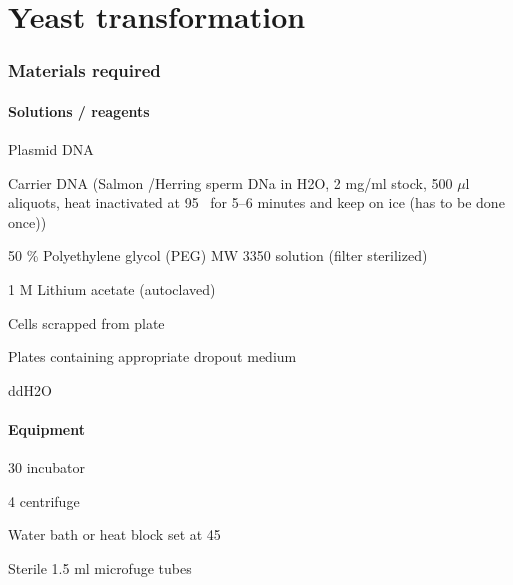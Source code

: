 \part{Yeast transformation}
 \newpage
\setlength{\parindent}{0pt}
\setcounter{secnumdepth}{5}
\setcounter{section}{0}
\renewcommand*{\theHsection}{trans.\the\value{section}}
\section {Materials required}
	\subsection{Solutions / reagents}
			\begin{packed_enum}
				\item Plasmid DNA
				\item Carrier DNA{} (Salmon /Herring sperm DNa in H{\scriptsize2}O, 2 mg/ml stock, 500 $\mu$l aliquots, heat inactivated at 95 \textcelsius\ for 5--6 minutes and keep on ice (has to be done once))
				\item 50 \% Polyethylene glycol (PEG) MW 3350 solution (filter sterilized)
				\item 1 M Lithium acetate (autoclaved)
				\item Cells scrapped from plate
				\item Plates containing appropriate dropout medium
				\item ddH{\scriptsize2}O
					\end{packed_enum}
	\subsection{Equipment}
			\begin{packed_enum}
				\item 30 {\textcelsius} incubator
				\item 4 {\textcelsius} centrifuge
				\item Water bath or heat block set at 45 \textcelsius
				\item Sterile 1.5 ml microfuge tubes
			\end{packed_enum}
 
		
